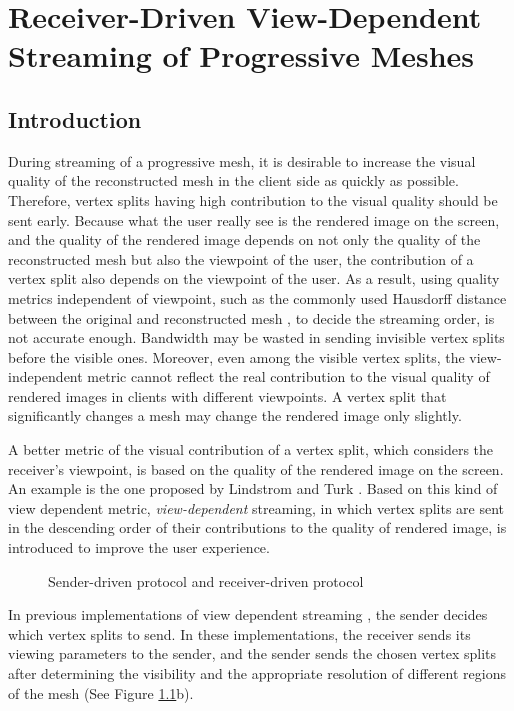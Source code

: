 \chapter{Receiver-Driven View-Dependent Streaming of Progressive Meshes}
\label{c:rdstream}
\section{Introduction}
\label{s:dstream:intro}
    During streaming of a progressive mesh, it is desirable to 
    increase the visual quality of the reconstructed mesh in the client side
    as quickly as possible. 
    Therefore, vertex splits having high contribution to the visual quality
    should be sent early. 
    Because what the user really see is the rendered image on the screen,
    and the quality of the rendered image depends on not only the quality of the reconstructed
    mesh but also the viewpoint of the user,  the contribution of a vertex split 
    also depends on the viewpoint of the user. 
    As a result, using quality metrics independent of viewpoint,
    such as the commonly used Hausdorff distance between the 
    original and reconstructed mesh \cite{cignoni98metro}, to
    decide the streaming order, is not accurate enough. 
    Bandwidth may be wasted in sending invisible vertex splits
    before the visible ones. Moreover, even among the visible vertex splits,
    the view-independent metric cannot reflect the real contribution to
    the visual quality of rendered images in clients with different viewpoints. 
    A vertex split that significantly changes a mesh may change the rendered image 
    only slightly.

    A better metric of the visual contribution of a vertex split, 
    which considers the receiver's viewpoint, is 
    based on the quality of the rendered image on the screen.
    An example is the one proposed by Lindstrom and Turk \cite{353995}.
    Based on this kind of view dependent metric, \emph{view-dependent} streaming,
    in which vertex splits are sent in the descending order of 
    their contributions to the quality of rendered image, is introduced
    to improve the user experience. 
    
    \begin{figure}
    \centering
    \caption{Sender-driven protocol and receiver-driven protocol 
    \label{dstream:protocol}}
    \end{figure}
    In previous implementations of view dependent streaming
    \cite{To1999, 363375, progressive:Yang, kim:view, zheng:interactive}, 
    the sender decides which vertex splits to send. In these implementations,  
    the receiver sends its viewing parameters to the sender, 
    and the sender sends the chosen vertex splits after
    determining the visibility and the appropriate resolution of 
    different regions of the mesh (See Figure \ref{dstream:protocol}b).

